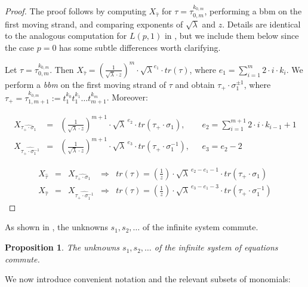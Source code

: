 \documentclass[11pt]{amsart}
\newtheorem{prop}{Proposition}
\begin{document}
\begin{proof}
The proof follows by computing \(X_{\widehat{\tau}}\) for \(\tau=\tau_{0,m}^{k_{0,m}}\), performing a bbm on the first moving strand, and comparing exponents of \(\sqrt{\lambda}\) and \(z\). Details are identical to the analogous computation for \(L(p,1)\) in \cite{DL4}, but we include them below since the case $p=0$ has some subtle differences worth clarifying.

Let $\tau=\tau_{0,m}^{k_{0,m}}$. Then $X_{\widehat{\tau}}=\left(\frac{1}{\sqrt{\lambda}\cdot z} \right)^m\cdot \sqrt{\lambda}^{e_1}\cdot tr(\tau)$, where $e_1=\sum_{i=1}^{m}{2\cdot i\cdot k_i}$. We perform a {\it bbm} on the first moving strand of $\tau$ and obtain $\tau_+\cdot \sigma_1^{\pm 1}$, where $\tau_{+}=\tau_{1, m+1}^{k_{0,m}}:=t_1^{k_0}t_1^{k_1}\ldots t_{m+1}^{k_m}$. Moreover:

\[
\begin{array}{llll}
X_{\widehat{\tau_+\cdot \sigma_1}} & = & \left(\frac{1}{\sqrt{\lambda}\cdot z} \right)^{m+1}\cdot \sqrt{\lambda}^{\ e_2}\cdot tr(\tau_+\cdot \sigma_1), &\ \ \ e_2= \sum_{i=1}^{m+1}{2\cdot i\cdot k_{i-1}+1}  \\
X_{\widehat{\tau_+\cdot \sigma_1^{-1}}} & = & \left(\frac{1}{\sqrt{\lambda}\cdot z} \right)^{m+1}\cdot \sqrt{\lambda}^{\ e_3}\cdot tr(\tau_+\cdot \sigma_1^{-1}), &\ \ \ e_3= e_2-2
\end{array}
\]


\[
\begin{array}{lllll}
X_{\widehat{\tau}} & = & X_{\widehat{\tau_+\cdot \sigma_1}} & \Rightarrow &  tr(\tau)=\left(\frac{1}{z} \right)\cdot \sqrt{\lambda}^{\ e_2-e_1-1}\cdot tr(\tau_+\cdot \sigma_1)\\
X_{\widehat{\tau}} & = & X_{\widehat{\tau_+\cdot \sigma_1^{-1}}} & \Rightarrow & tr(\tau)=\left(\frac{1}{z} \right)\cdot \sqrt{\lambda}^{\ e_3-e_1-3}\cdot tr(\tau_+\cdot \sigma_1^{-1})
\end{array}
\]

\end{proof}



As shown in \cite{DL4}, the unknowns \(s_1, s_2, \ldots\) of the infinite system commute.

\begin{prop}
The unknowns \(s_1, s_2, \ldots\) of the infinite system of equations commute.
\end{prop}



We now introduce convenient notation and the relevant subsets of monomials:
\end{document}
